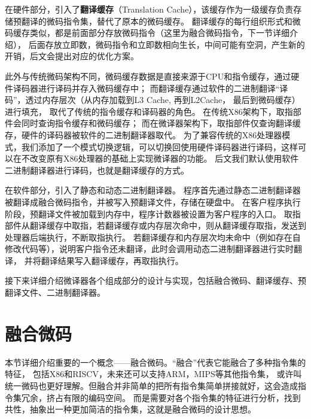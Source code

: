 
在硬件部分，引入了\textbf{翻译缓存}（Translation Cache），该缓存作为一级缓存负责存储预翻译的微码指令集，替代了原本的微码缓存。
翻译缓存的每行组织形式和微码缓存类似，都是前面部分存放微码指令（这里为融合微码指令，下一节详细介绍），
后面存放立即数，微码指令和立即数相向生长，中间可能有空洞，产生新的开销，后文会提出对应的优化方案。

此外与传统微码架构不同，微码缓存数据是直接来源于CPU和指令缓存，通过硬件译码器进行译码并存入微码缓存中；
而翻译缓存通过软件的二进制翻译“译码”，透过内存层次（从内存加载到L3 Cache, 再到L2Cache， 最后到微码缓存）进行填充，
取代了传统的指令缓存和译码器的角色。
在传统X86架构下，取指部件会同时查询指令缓存和微码缓存；
而在微译器架构下，取指部件仅查询翻译缓存，硬件的译码器被软件的二进制翻译器取代。
为了兼容传统的X86处理器模式，我们添加了一个模式切换逻辑，可以切换回使用硬件译码器进行译码，这样可以在不改变原有X86处理器的基础上实现微译器的功能。
后文我们默认使用软件二进制翻译器进行译码，也就是翻译缓存的方式。


在软件部分，引入了静态和动态二进制翻译器。
程序首先通过静态二进制翻译器被翻译成融合微码指令，并被写入预翻译文件，存储在硬盘中。
在客户程序执行阶段，预翻译文件被加载到内存中，程序计数器被设置为客户程序的入口。
取指部件从翻译缓存中取指，若翻译缓存或内存层次命中，则从翻译缓存取指，发送到处理器后端执行，不断取指执行。
若翻译缓存和内存层次均未命中（例如存在自修改代码等），说明客户指令还未翻译，此时会调用动态二进制翻译器进行实时翻译，
并将翻译结果写入翻译缓存，再取指执行。

接下来详细介绍微译器各个组成部分的设计与实现，包括融合微码、翻译缓存、预翻译文件、二进制翻译器。

\section{融合微码}\label{sec:tisa}
本节详细介绍重要的一个概念——融合微码。“融合”代表它能融合了多种指令集的特征，
包括X86和RISCV，未来还可以支持ARM，MIPS等其他指令集，
或许叫统一微码也更好理解。但融合并非简单的把所有指令集简单拼接就好，这会造成指令集冗余，挤占有限的编码空间。
而是需要对各个指令集的特征进行分析，找到共性，抽象出一种更加简洁的指令集，这就是融合微码的设计思想。

